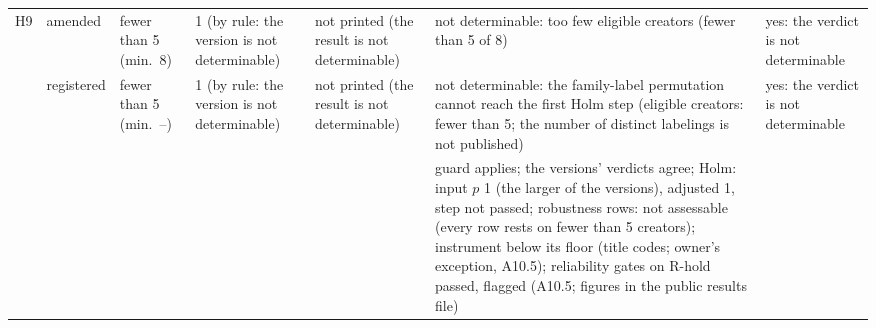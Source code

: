 {\begin{tabular}{@{}p{}p{}p{}p{}p{}p{}p{}@{}}
\midrule
H9 & amended & fewer than 5 (min.~8) & 1 (by rule: the version is not determinable) & not printed (the result is not determinable) & not determinable: too few eligible creators (fewer than 5 of 8) & yes: the verdict is not determinable \\
 & registered & fewer than 5 (min.~--) & 1 (by rule: the version is not determinable) & not printed (the result is not determinable) & not determinable: the family-label permutation cannot reach the first Holm step (eligible creators: fewer than 5; the number of distinct labelings is not published) & yes: the verdict is not determinable \\
 &  &  &  &  & guard applies; the versions' verdicts agree; Holm: input $p$ 1 (the larger of the versions), adjusted 1, step not passed; robustness rows: not assessable (every row rests on fewer than 5 creators); instrument below its floor (title codes; owner's exception, A10.5); reliability gates on R-hold passed, flagged (A10.5; figures in the public results file) &  \\
\bottomrule
\end{tabular}}
